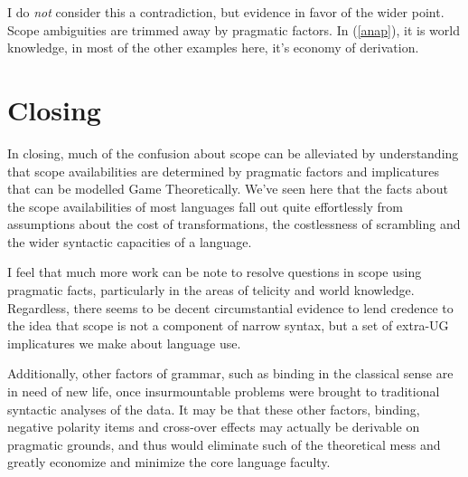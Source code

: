 \documentclass{article}
\begin{document}
I do \emph{not} consider this a contradiction, but evidence in favor of the wider point. Scope ambiguities are trimmed away by pragmatic factors. In (\ref{anap}), it is world knowledge, in most of the other examples here, it's economy of derivation.

\section{Closing}

In closing, much of the confusion about scope can be alleviated by understanding that scope availabilities are determined by pragmatic factors and implicatures that can be modelled Game Theoretically. We've seen here that the facts about the scope availabilities of most languages fall out quite effortlessly from assumptions about the cost of transformations, the costlessness of scrambling and the wider syntactic capacities of a language.

I feel that much more work can be note to resolve questions in scope using pragmatic facts, particularly in the areas of telicity and world knowledge. Regardless, there seems to be decent circumstantial evidence to lend credence to the idea that scope is not a component of narrow syntax, but a set of extra-UG implicatures we make about language use.

Additionally, other factors of grammar, such as binding in the classical sense are in need of new life, once insurmountable problems were brought to traditional syntactic analyses of the data. It may be that these other factors, binding, negative polarity items and cross-over effects may actually be derivable on pragmatic grounds, and thus would eliminate such of the theoretical mess and greatly economize and minimize the core language faculty.


\printbibliography
\end{document}
